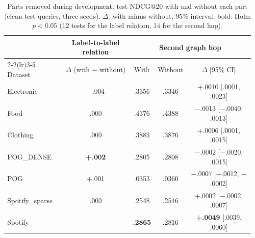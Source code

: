 \documentclass[runningheads]{llncs}
\begin{document}
\begin{table}[t]
\centering
\caption{Parts removed during development: test NDCG@20 with and without each part (clean test queries, three
seeds). $\Delta$: with minus without, 95\% interval; bold: Holm $p<0.05$ (12 tests for the label relation, 14 for the
second hop).}
\label{tab:removed}
\setlength{\tabcolsep}{3pt}
\scriptsize
\begin{tabular}{lcccc}
\toprule
& \multicolumn{1}{c}{Label-to-label relation} & \multicolumn{3}{c}{Second graph hop}\\
\cmidrule(lr){2-2}\cmidrule(lr){3-5}
Dataset & $\Delta$ (with $-$ without) & With & Without & $\Delta$ [95\% CI]\\
\midrule
Electronic & $-$.004 & .3356 & .3346 & +.0010 [.0001, .0023]\\
Food & .000 & .4376 & .4388 & $-$.0013 [$-$.0040, .0013]\\
Clothing & .000 & .3883 & .3876 & +.0006 [.0001, .0015]\\
POG\_DENSE & \textbf{+.002} & .2805 & .2808 & $-$.0002 [$-$.0020, .0015]\\
POG & +.001 & .0353 & .0360 & $\mathbf{-.0007}$ [$-$.0012, $-$.0002]\\
Spotify\_sparse & .000 & .2548 & .2546 & +.0002 [$-$.0002, .0007]\\
Spotify & -- & \textbf{.2865} & .2816 & \textbf{+.0049} [.0039, .0060]\\
\bottomrule
\end{tabular}
\end{table}
\end{document}
